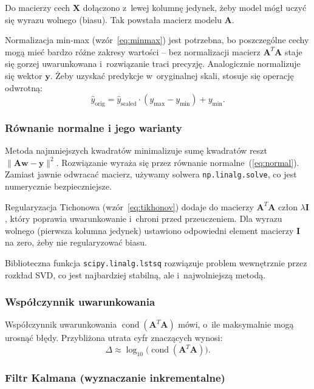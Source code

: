 \documentclass[12pt, a4paper]{article}
\begin{document}
Do macierzy cech $\mathbf{X}$ dołączono z~lewej kolumnę jedynek, żeby model mógł
uczyć się wyrazu wolnego (biasu). Tak powstała macierz modelu $\mathbf{A}$.

Normalizacja min-max (wzór~\ref{eq:minmax}) jest potrzebna, bo poszczególne cechy mogą
mieć bardzo różne zakresy wartości -- bez normalizacji macierz
$\mathbf{A}^T\mathbf{A}$ staje się gorzej uwarunkowana i~rozwiązanie traci precyzję.
Analogicznie normalizuje się wektor $\mathbf{y}$. Żeby uzyskać predykcje w~oryginalnej
skali, stosuje się operację odwrotną:
\begin{equation}
  \hat{y}_{\text{orig}} = \hat{y}_{\text{scaled}}\cdot(y_{\max} - y_{\min}) + y_{\min}.
  \label{eq:unscale}
\end{equation}

\subsubsection{Równanie normalne i jego warianty}

Metoda najmniejszych kwadratów minimalizuje sumę kwadratów reszt
$\|\mathbf{A}\mathbf{w} - \mathbf{y}\|^2$. Rozwiązanie wyraża się przez równanie
normalne~(\ref{eq:normal}). Zamiast jawnie odwracać macierz, używamy solwera
\texttt{np.linalg.solve}, co jest numerycznie bezpieczniejsze.

Regularyzacja Tichonowa (wzór~\ref{eq:tikhonov}) dodaje do macierzy $\mathbf{A}^T\mathbf{A}$
człon $\lambda\mathbf{I}$, który poprawia uwarunkowanie i~chroni przed
przeuczeniem. Dla wyrazu wolnego (pierwsza kolumna jedynek) ustawiono
odpowiedni element macierzy $\mathbf{I}$ na zero, żeby nie regularyzować biasu.

Biblioteczna funkcja \texttt{scipy.linalg.lstsq} rozwiązuje problem wewnętrznie
przez rozkład SVD, co jest najbardziej stabilną, ale i~najwolniejszą metodą.

\subsubsection{Współczynnik uwarunkowania}

Współczynnik uwarunkowania $\operatorname{cond}(\mathbf{A}^T\mathbf{A})$ mówi,
o~ile maksymalnie mogą urosnąć błędy. Przybliżona utrata cyfr znaczących wynosi:
\begin{equation}
  \Delta \approx \log_{10}\!\bigl(\operatorname{cond}(\mathbf{A}^T\mathbf{A})\bigr).
\end{equation}

\subsubsection{Filtr Kalmana (wyznaczanie inkrementalne)}
\end{document}

